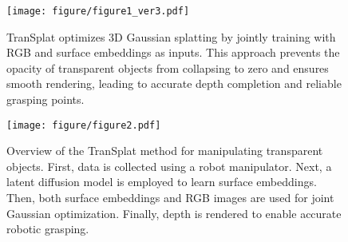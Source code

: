 \begin{figure}[!t]
    \centering
    \texttt{[image: figure/figure1\_ver3.pdf]}
    \caption{TranSplat optimizes 3D Gaussian splatting by jointly training with RGB and surface embeddings as inputs. This approach prevents the opacity of transparent objects from collapsing to zero and ensures smooth rendering, leading to accurate depth completion and reliable grasping points.}
    \label{fig:figure1}
    \vspace{-7mm}
\end{figure}



\begin{figure*}[t]
    \centering
    \texttt{[image: figure/figure2.pdf]}
    \caption{Overview of the TranSplat method for manipulating transparent objects. First, data is collected using a robot manipulator. Next, a latent diffusion model is employed to learn surface embeddings. Then, both surface embeddings and RGB images are used for joint Gaussian optimization. Finally, depth is rendered to enable accurate robotic grasping.}
    \label{fig:method-overview}
    \vspace{-6mm}
\end{figure*}


